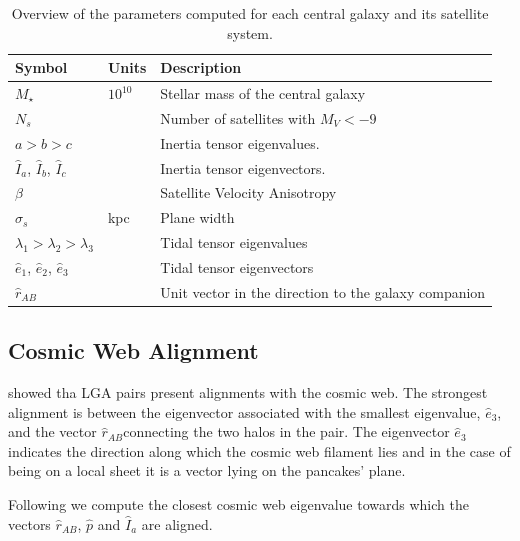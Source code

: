 \documentclass[a4paper,fleqn,usenatbib]{mnras}
\newcommand{\Msun}{{\ifmmode{{\rm{M_{\odot}}}}\else{${\rm{M_{\odot}}}$}\fi}}
\begin{document}
\begin{table}
  \centering
\begin{tabular}{lll}
\hline\hline
Symbol & Units & Description\\\hline
$M_{\star}$ & $10^{10}$\Msun & Stellar mass of the central galaxy\\
$N_s$ & & Number of satellites with $M_V<-9$\\
$a > b> c$ & & Inertia tensor eigenvalues. \\
$\hat{I}_a$, $\hat{I}_b$, $\hat{I}_c$ & & Inertia tensor eigenvectors. \\
$\beta$  &  & Satellite Velocity Anisotropy\\
$\sigma_s$ & kpc & Plane width\\
$\lambda_1>\lambda_2>\lambda_3$ &  & Tidal tensor
eigenvalues\\
$\hat{e}_{1}$,  $\hat{e}_{2}$,  $\hat{e}_{3}$ &  & Tidal tensor
eigenvectors\\ 
$\hat{r}_{AB}$& & Unit vector in the direction to the galaxy companion\\
\hline\hline
\end{tabular}
  \caption{Overview of the parameters computed for each central galaxy
    and its satellite system.
  \label{tab:models}}
\end{table}

\subsection{Cosmic Web Alignment}
\label{sub:webalignment}

\cite{2015ApJ...799...45F} showed tha LGA pairs present alignments
with the cosmic web.
The strongest alignment is between the eigenvector associated  with the smallest
eigenvalue, $\hat{e}_3$, and the vector $\hat{r}_{AB} $connecting the two halos in
the pair. 
The eigenvector $\hat{e}_3$ indicates the direction along
which the cosmic web filament lies and in the case of being on a local
sheet it is a vector lying on the pancakes' plane. 

Following \cite{2014MNRAS.443.1090F} we compute the closest cosmic web
eigenvalue  towards which the vectors $\hat{r}_{AB}$, $\hat{p}$ and
$\hat{I}_a$ are aligned. 







\end{document}
